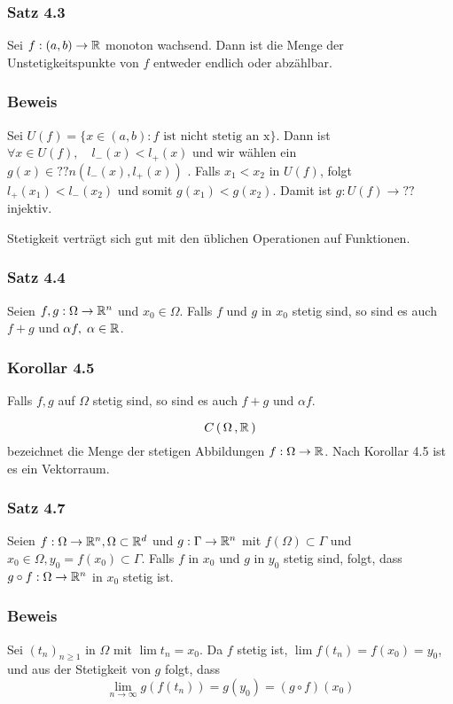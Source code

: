 \subsubsection*{Satz 4.3}
Sei $f:(a,b)\to\mathbb{R}$ monoton wachsend. Dann ist die Menge der Unstetigkeitspunkte von $f$ entweder endlich oder abzählbar.
\subsubsection*{Beweis}
Sei $U(f) = \{x\in(a,b):f \text{ ist nicht stetig an x}\}$. Dann ist $\forall x\in U(f), \quad l_{-}(x) < l_{+}(x)$ und wir wählen ein $g(x)\in ??n(l_{-}(x),l_{+}(x))$ .
Falls $x_{1}<x_{2}$ in $U(f)$, folgt $l_{+}(x_{1})<l_{-}(x_{2})$ und somit $g(x_{1})<g(x_{2})$. Damit ist $g:U(f)\to ??$  injektiv.

\noindent Stetigkeit verträgt sich gut mit den üblichen Operationen auf Funktionen.

\subsubsection*{Satz 4.4}
Seien $f,g:\Omega \to \mathbb{R}^{n}$ und $x_{0}\in\Omega$. Falls $f$ und $g$ in $x_{0}$ stetig sind, so sind es auch $f+g$ und $\alpha f, \; \alpha \in \mathbb{R}$.

\subsubsection*{Korollar 4.5}
Falls $f,g$ auf $\Omega$ stetig sind, so sind es auch $f+g$ und $\alpha f$.

\begin{definition}{4.6}
\[ C\,(\,\Omega\, , \mathbb{R}\,) \] bezeichnet die Menge der stetigen Abbildungen $f: \Omega\to\mathbb{R}$. Nach Korollar 4.5 ist es ein Vektorraum.
\end{definition}

\subsubsection*{Satz 4.7}
Seien $f:\Omega\to\mathbb{R}^{n}, \Omega \subset \mathbb{R}^{d}$ und $g:\Gamma \to \mathbb{R}^{n}$ mit $f(\Omega)\subset\Gamma$ und ${x_{0}\in\Omega}, {y_{0}=f(x_{0})\subset\Gamma}$. Falls $f$ in $x_{0}$ und $g$ in $y_{0}$ stetig sind, folgt, dass $g\circ f:\Omega\to\mathbb{R}^{n}$ in $x_{0}$ stetig ist.

\subsubsection*{Beweis}
Sei $(t_{n})_{n\geq1}$ in $\Omega$ mit $\lim{t_{n}} = x_{0}$. Da $f$ stetig ist, $\lim{f(t_{n})} = f(x_{0}) = y_{0}$, und aus der Stetigkeit von $g$ folgt, dass \[ \lim_{n\to\infty}{g(f(t_{n}))} = g(y_{0}) = (g \circ f)(x_{0}) \]

